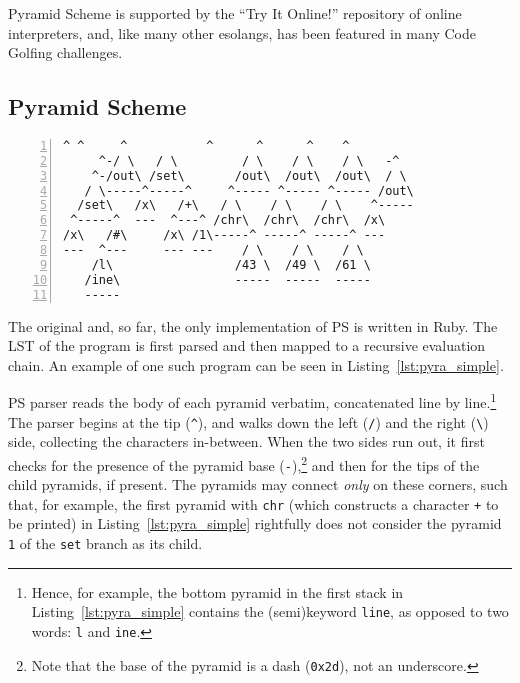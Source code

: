 \documentclass[aip,jcp,reprint,footinbib]{revtex4-1}
\let\tt\texttt
\newcommand{\ilpsll}[1]{\lstinline[language=psll,columns=flexible]{#1}}
\begin{document}
Pyramid Scheme is supported by the \enquote{Try It Online!} repository of online interpreters,\cite{tio} and, like many other esolangs, has been featured in many Code Golfing challenges.\cite{golf_se}

\subsection{Pyramid Scheme}

\begin{lstlisting}[float,language=pyra,frame=tb,numbers=left,caption={\label{lst:pyra_simple}
A simple Pyramid Scheme program. It takes one input from \tt{stdin} -- \ilpsll{(set x (\# stdin))}, increments it by one -- \ilpsll{(set x (+ x 1))} and prints the result computation to the command line.
}]
      ^ ^     ^           ^      ^      ^    ^
     ^-/ \   / \         / \    / \    / \   -^
    ^-/out\ /set\       /out\  /out\  /out\  / \
   / \-----^-----^     ^----- ^----- ^----- /out\
  /set\   /x\   /+\   / \    / \    / \    ^-----
 ^-----^  ---  ^---^ /chr\  /chr\  /chr\  /x\
/x\   /#\     /x\ /1\-----^ -----^ -----^ ---
---  ^---     --- ---    / \    / \    / \
    /l\                 /43 \  /49 \  /61 \
   /ine\                -----  -----  -----
   -----
\end{lstlisting}

The original and, so far, the only implementation of PS is written in Ruby.\cite{pyra_git} The LST of the program is first parsed and then mapped to a recursive evaluation chain. An example of one such program can be seen in Listing~\ref{lst:pyra_simple}.

PS parser reads the body of each pyramid verbatim, concatenated line by line.\footnote{Hence, for example, the bottom pyramid in the first stack in Listing~\ref{lst:pyra_simple} contains the (semi)keyword \tt{line}, as opposed to two words: \tt{l} and \tt{ine}.} The parser begins at the tip (\tt{\^}), and walks down the left (\tt{/}) and the right (\tt{\textbackslash}) side, collecting the characters in-between. When the two sides run out, it first checks for the presence of the pyramid base (\tt{-}),\footnote{Note that the base of the pyramid is a dash (\tt{0x2d}), not an underscore.} and then for the tips of the child pyramids, if present. The pyramids may connect \emph{only} on these corners, such that, for example, the first pyramid with \tt{chr} (which constructs a character \tt{+} to be printed) in Listing~\ref{lst:pyra_simple} rightfully does not consider the pyramid \tt{1} of the \tt{set} branch as its child.
\end{document}
